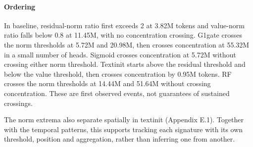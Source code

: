 \documentclass{article}
\begin{document}
\paragraph{Ordering} In baseline, residual-norm ratio first exceeds 2 at 3.82M tokens and value-norm ratio falls below 0.8 at 11.45M, with no concentration crossing. G1gate crosses the norm thresholds at 5.72M and 20.98M, then crosses concentration at 55.32M in a small number of heads. Sigmoid crosses concentration at 5.72M without crossing either norm threshold. Textinit starts above the residual threshold and below the value threshold, then crosses concentration by 0.95M tokens. RF crosses the norm thresholds at 14.44M and 51.64M without crossing concentration. These are first observed events, not guarantees of sustained crossings.

The norm extrema also separate spatially in textinit (Appendix E.1). Together with the temporal patterns, this supports tracking each signature with its own threshold, position and aggregation, rather than inferring one from another.


\newpage

\end{document}
